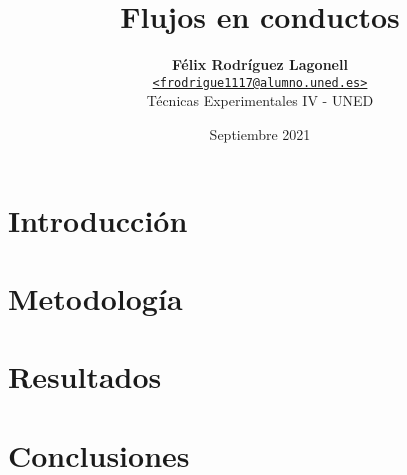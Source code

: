 \documentclass[a4paper, twocolumn]{article}
\title{\vspace{-1.5em}\textbf{Flujos en conductos}}
\author{{\textbf{Félix Rodríguez Lagonell}} \\
        {\href{mailto:frodrigue1117@alumno.uned.es}
        {\texttt{<frodrigue1117@alumno.uned.es>}}} \\
        {Técnicas Experimentales IV - UNED}}
\date{Septiembre 2021}
\begin{document}
    \maketitle

    \begin{abstract}  \end{abstract} %
    \section{Introducción} \label{sec:introduction} 
    \section{Metodología} \label{sec:related_work} 
    \section{Resultados} \label{sec:results} 
    \section{Conclusiones} \label{sec:conclusions} 

    \nocite{*} %
    
    
    \appendix

    
\end{document}
